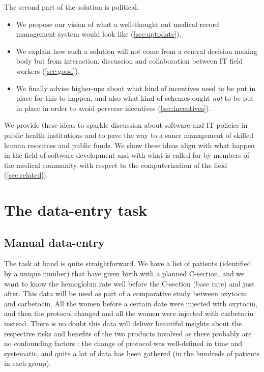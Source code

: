 \documentclass[nobib]{tufte-handout}
\begin{document}
The second part of the solution is political. 
\begin{itemize}
\item We propose our vision of what a well-thought out medical record management system would look like (\autoref{sec:uptodate}).
\item We explain how such a solution will not come from a central decision making body but from interaction, discussion and collaboration between IT field workers (\autoref{sec:good}).
\item We finally advise higher-ups about what kind of incentives need to be put in place for this to happen, and also what kind of schemes ought \emph{not} to be put in place in order to avoid perverse incentives (\autoref{sec:incentives}).
\end{itemize}

We provide these ideas to sparkle discussion about software and IT policies in public health institutions and to pave the way to a saner management of skilled human resources and public funds. We show these ideas align with what happen in the field of software development and with what is called for by members of the medical community with respect to the computerization of the field (\autoref{sec:related}).


\section{The data-entry task}
\label{sec:dataentry}

\subsection{Manual data-entry}
\label{sec:manual}

The task at hand is quite straightforward. We have a list of patients (identified by a unique number) that have given birth with a planned C-section, and we want to know the hemoglobin rate well before the C-section (base rate) and just after. This data will be used as part of a comparative study between oxytocin and carbetocin. All the women before a certain date were injected with oxytocin, and then the protocol changed and all the women were injected with carbetocin instead. There is no doubt this data will deliver beautiful insights about the respective risks and benefits of the two products involved as there probably are no confounding factors : the change of protocol was well-defined in time and systematic, and quite a lot of data has been gathered (in the hundreds of patients in each group).
\end{document}
